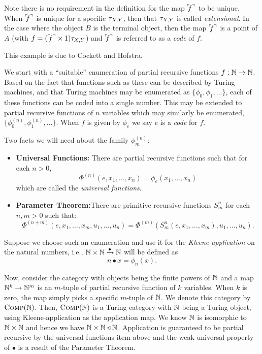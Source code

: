 Note there is no requirement in the definition for the map ${}^\ulcorner\!\!f^\urcorner$ to be unique. When ${}^\ulcorner\!\!f^\urcorner$ is unique
for a specific $\tau_{{X},{Y}}$, then that $\tau_{{X},{Y}}$ is called \emph{extensional}. In the case where the object
$B$ is the terminal object, then the map ${}^\ulcorner\!\!f^\urcorner$ is a point of $A$ (with $f = ({}^\ulcorner\!\!f^\urcorner \times 1)\tau_{{X},{Y}}$) and
${}^\ulcorner\!\!f^\urcorner$ is referred to as a \emph{code} of $f$.

\begin{example}\label{ex:turing-category-kleene}
  This example is due to Cockett and Hofstra\cite{cockett-hostra08-intro-to-turing}.

  We start with a ``suitable'' enumeration of partial recursive functions $f:\mathbb{N}\to\mathbb{N}$. Based on
  the fact that functions such as these can be described by Turing machines, and that Turing
  machines may be enumerated as $\{\phi_0,\phi_1,\ldots\}$, each of these functions can be coded
  into a single number. This may be extended to partial recursive functions of $n$ variables which
  may similarly be enumerated, $\{\phi_0^{(n)},\phi_1^{(n)},\ldots\}$. When $f$ is given by $\phi_e$
  we say $e$ is a \emph{code} for $f$.

  Two facts we will need about the family $\phi_m^{(n)}$:
  \begin{itemize}
    \item \textbf{Universal Functions:} There are partial recursive functions such that for each $n > 0$,
      \[ \Phi^{(n)}(e,x_1,\ldots,x_n) = \phi_e(x_1,\ldots,x_n) \]
      which are called the \emph{universal functions}.
    \item \textbf{Parameter Theorem:}There are primitive recursive functions $S_m^n$ for each $n,m >
      0$ such that:
      \[ \Phi^{(n+m)}(e,x_1,\ldots,x_m,u_1,\ldots,u_n) = \Phi^{(m)}(S_m^n(e,x_1,\ldots,x_m),u_1,\ldots,u_n).\]
  \end{itemize}

  Suppose we choose such an enumeration and use it for the \emph{Kleene-application} on the natural
  numbers, i.e., $\mathbb{N}\times\mathbb{N}\xrightarrow{\bullet}\mathbb{N}$ will be defined as
  \[
    n\bullet x = \phi_n(x).
  \]

  Now, consider the category with objects being the finite powers of $\mathbb{N}$ and a map $\mathbb{N}^k \to
  \mathbb{N}^m$ is an $m$-tuple of partial recursive function of $k$ variables. When $k$ is zero, the map
  simply picks a specific $m$-tuple of $\mathbb{N}$. We denote this category by $\textsc{Comp}(\mathbb{N})$.
  Then, $\textsc{Comp}(\mathbb{N})$ is a Turing category with $\mathbb{N}$ being a Turing object, using Kleene-application
  as the application map. We know $\mathbb{N}$ is isomorphic to $\mathbb{N}\times \mathbb{N}$ and hence we have $\mathbb{N}\times \mathbb{N}
  \triangleleft \mathbb{N}$. Application is guaranteed to be partial recursive by the universal functions item
  above and the weak universal property of $\bullet$ is a result of the Parameter Theorem.
\end{example}

